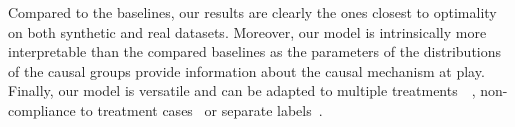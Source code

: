Compared to the baselines, our results are clearly the ones closest to optimality on both synthetic and real datasets. %
Moreover, our model is intrinsically more interpretable than the compared baselines as the parameters of the distributions of the causal groups provide information about the causal mechanism at play. 
Finally, our model is versatile and can be adapted to multiple treatments~~\cite{frolich2004programme}, non-compliance to treatment cases~\cite{Imbens1997} or separate labels~\cite{yamane2018uplift}.